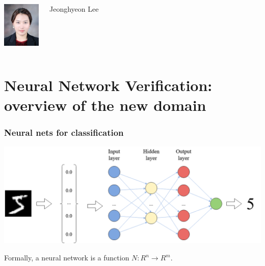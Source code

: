 \documentclass[aspectratio=169]{beamer}
\begin{document}
\begin{frame}
\begin{columns}
\includegraphics[width=1.8cm]{Images/JL.jpeg}
\begin{block}{\footnotesize{Jeonghyeon Lee}}
   \end{block}


  \end{columns}
  \end{frame}




\section{Neural Network Verification: overview of the new domain}


\begin{frame}
\frametitle{Neural nets for classification}
\includegraphics[scale=.30]{Images/mnist_classification.png}

\begin{block}{Formally,}
 a neural network is a function $N : R^n \rightarrow R^m$.
\end{block}

\end{frame}
\end{document}
